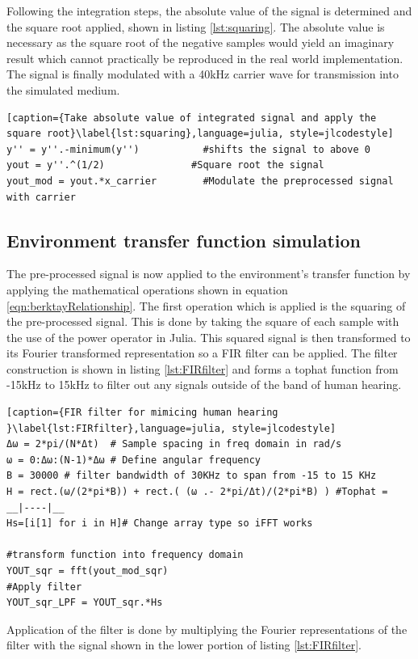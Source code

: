 Following the integration steps, the absolute value of the signal is determined and the square root applied, shown in listing \ref{lst:squaring}. The absolute value is necessary as the square root of the negative samples would yield an imaginary result which cannot practically be reproduced in the real world implementation. The signal is finally modulated with a 40kHz carrier wave for transmission into the simulated medium.

\begin{lstlisting}[caption={Take absolute value of integrated signal and apply the square root}\label{lst:squaring},language=julia, style=jlcodestyle]
y'' = y''.-minimum(y'')           #shifts the signal to above 0
yout = y''.^(1/2)               #Square root the signal
yout_mod = yout.*x_carrier        #Modulate the preprocessed signal with carrier
\end{lstlisting}

\subsection{Environment transfer function simulation}
The pre-processed signal is now applied to the environment's transfer function by applying the mathematical operations shown in equation \ref{eqn:berktayRelationship}. The first operation which is applied is the squaring of the pre-processed signal. This is done by taking the square of each sample with the use of the power operator in Julia. This squared signal is then transformed to its Fourier transformed representation so a FIR filter can be applied. The filter construction is shown in listing \ref{lst:FIRfilter} and forms a tophat function from -15kHz to 15kHz to filter out any signals outside of the band of human hearing.

\begin{lstlisting}[caption={FIR filter for mimicing human hearing }\label{lst:FIRfilter},language=julia, style=jlcodestyle]
Δω = 2*pi/(N*Δt)  # Sample spacing in freq domain in rad/s
ω = 0:Δω:(N-1)*Δω # Define angular frequency 
B = 30000 # filter bandwidth of 30KHz to span from -15 to 15 KHz
H = rect.(ω/(2*pi*B)) + rect.( (ω .- 2*pi/Δt)/(2*pi*B) ) #Tophat = __|----|__
Hs=[i[1] for i in H]# Change array type so iFFT works

#transform function into frequency domain
YOUT_sqr = fft(yout_mod_sqr)
#Apply filter
YOUT_sqr_LPF = YOUT_sqr.*Hs
\end{lstlisting}

Application of the filter is done by multiplying the Fourier representations of the filter with the signal shown in the lower portion of listing \ref{lst:FIRfilter}.\\

